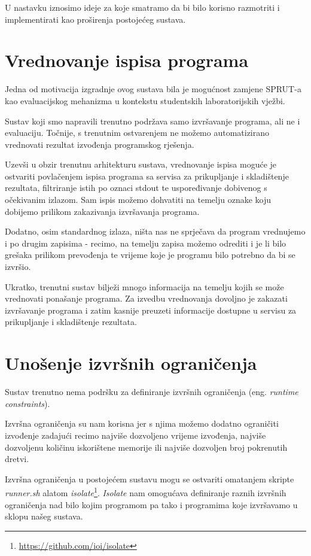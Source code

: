 \documentclass[times, utf8, zavrsni]{fer}
\begin{document}
{U nastavku iznosimo ideje za koje smatramo da bi bilo korisno razmotriti i implementirati kao proširenja postojećeg sustava.

\section{Vrednovanje ispisa programa}

Jedna od motivacija izgradnje ovog sustava bila je mogućnost zamjene SPRUT-a kao evaluacijskog mehanizma u kontekstu studentskih laboratorijskih vježbi.

Sustav koji smo napravili trenutno podržava samo izvršavanje programa, ali ne i evaluaciju. Točnije, s trenutnim ostvarenjem ne možemo automatizirano vrednovati rezultat izvođenja programskog rješenja.

Uzevši u obzir trenutnu arhitekturu sustava, vrednovanje ispisa moguće je ostvariti povlačenjem ispisa programa sa servisa za prikupljanje i skladištenje rezultata, filtriranje istih po oznaci stdout te uspoređivanje dobivenog s očekivanim izlazom. Sam ispis možemo dohvatiti na temelju oznake koju dobijemo prilikom zakazivanja izvršavanja programa.

Dodatno, osim standardnog izlaza, ništa nas ne sprječava da program vrednujemo i po drugim zapisima - recimo, na temelju zapisa možemo odrediti i je li bilo grešaka prilikom prevođenja te vrijeme koje je programu bilo potrebno da bi se izvršio.

Ukratko, trenutni sustav bilježi mnogo informacija na temelju kojih se može vrednovati ponašanje programa. Za izvedbu vrednovanja dovoljno je zakazati izvršavanje programa i zatim kasnije preuzeti informacije dostupne u servisu za prikupljanje i skladištenje rezultata.

\section{Unošenje izvršnih ograničenja}

Sustav trenutno nema podršku za definiranje izvršnih ograničenja (eng. {\textit{runtime constraints}}).

Izvršna ograničenja su nam korisna jer s njima možemo dodatno ograničiti izvođenje zadajući recimo najviše dozvoljeno vrijeme izvođenja, najviše dozvoljenu količinu iskorištene memorije ili najviše dozvoljen broj pokrenutih dretvi.

Izvršna ograničenja u postojećem sustavu mogu se ostvariti omatanjem skripte {\textit{runner.sh}} alatom {\textit{isolate}}\footnote{\url{https://github.com/ioi/isolate}}. {\textit{Isolate}} nam omogućava definiranje raznih izvršnih ograničenja nad bilo kojim programom pa tako i programima koje izvršavamo u sklopu našeg sustava.

}
\end{document}
